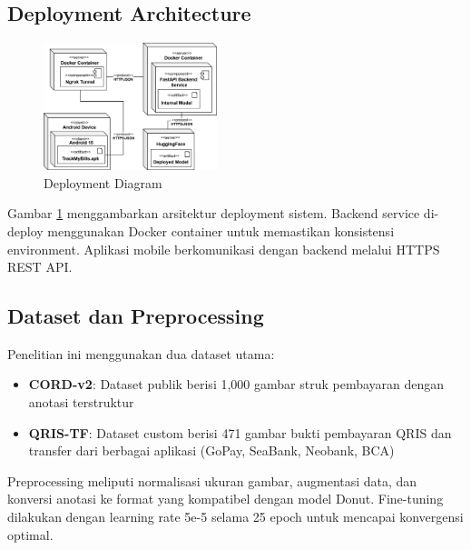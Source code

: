 \subsection{Deployment Architecture}
\begin{figure}[htbp]
    \centerline{\includegraphics[width=0.45\textwidth]{images/deployment-diagram.png}}
    \caption{Deployment Diagram}
    \label{fig:deployment}
\end{figure}

Gambar \ref{fig:deployment} menggambarkan arsitektur deployment sistem. Backend service di-deploy menggunakan Docker container untuk memastikan konsistensi environment. Aplikasi mobile berkomunikasi dengan backend melalui HTTPS REST API.

\subsection{Dataset dan Preprocessing}
Penelitian ini menggunakan dua dataset utama:
\begin{itemize}
    \item \textbf{CORD-v2}: Dataset publik berisi 1,000 gambar struk pembayaran dengan anotasi terstruktur
    \item \textbf{QRIS-TF}: Dataset custom berisi 471 gambar bukti pembayaran QRIS dan transfer dari berbagai aplikasi (GoPay, SeaBank, Neobank, BCA)
\end{itemize}

Preprocessing meliputi normalisasi ukuran gambar, augmentasi data, dan konversi anotasi ke format yang kompatibel dengan model Donut. Fine-tuning dilakukan dengan learning rate 5e-5 selama 25 epoch untuk mencapai konvergensi optimal.